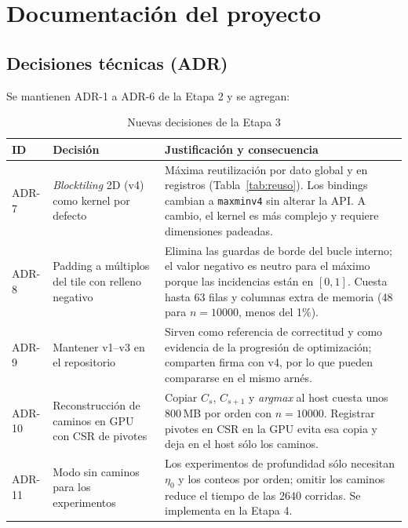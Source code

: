 \documentclass[11pt,a4paper]{article}
\begin{document}
\section{Documentación del proyecto}
\subsection{Decisiones técnicas (ADR)}
Se mantienen ADR-1 a ADR-6 de la Etapa 2 y se agregan:

{\small
\begin{longtable}{p{1.3cm}p{4.6cm}p{9.2cm}}
\caption{Nuevas decisiones de la Etapa 3}\\
\toprule
\textbf{ID} & \textbf{Decisión} & \textbf{Justificación y consecuencia}\\
\midrule
ADR-7 & \emph{Blocktiling} 2D (v4) como kernel por defecto &
Máxima reutilización por dato global y en registros (Tabla~\ref{tab:reuso}). Los bindings
cambian a \texttt{maxminv4} sin alterar la API. A cambio, el kernel es más complejo y requiere
dimensiones padeadas.\\
\addlinespace
ADR-8 & Padding a múltiplos del tile con relleno negativo &
Elimina las guardas de borde del bucle interno; el valor negativo es neutro para el máximo
porque las incidencias están en $[0,1]$. Cuesta hasta 63 filas y columnas extra de memoria
(48 para $n=\num{10000}$, menos del 1\%).\\
\addlinespace
ADR-9 & Mantener v1--v3 en el repositorio &
Sirven como referencia de correctitud y como evidencia de la progresión de optimización;
comparten firma con v4, por lo que pueden compararse en el mismo arnés.\\
\addlinespace
ADR-10 & Reconstrucción de caminos en GPU con CSR de pivotes &
Copiar $C_s$, $C_{s+1}$ y \emph{argmax} al host cuesta unos 800\,MB por orden con
$n=\num{10000}$. Registrar pivotes en CSR en la GPU evita esa copia y deja en el host sólo los
caminos.\\
\addlinespace
ADR-11 & Modo sin caminos para los experimentos &
Los experimentos de profundidad sólo necesitan $\eta_0$ y los conteos por orden; omitir los
caminos reduce el tiempo de las \num{2640} corridas. Se implementa en la Etapa 4.\\
\bottomrule
\end{longtable}
}
\end{document}

